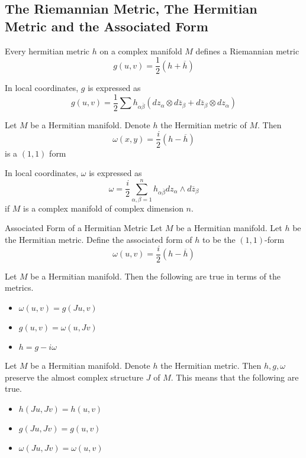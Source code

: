 \documentclass[a4paper]{article}
\begin{document}
\subsection{The Riemannian Metric, The Hermitian Metric and the Associated Form}
\begin{prp}{}{} Every hermitian metric $h$ on a complex manifold $M$ defines a Riemannian metric $$g(u,v)=\frac{1}{2}(h+\overline{h})$$
\end{prp}

In local coordinates, $g$ is expressed as $$g(u,v)=\frac{1}{2}\sum h_{\alpha\overline{\beta}}(dz_\alpha\otimes d\overline{z}_\beta+d\overline{z}_\beta\otimes dz_\alpha)$$

\begin{lmm}{}{} Let $M$ be a Hermitian manifold. Denote $h$ the Hermitian metric of $M$. Then $$\omega(x,y)=\frac{i}{2}(h-\overline{h})$$ is a $(1,1)$ form 
\end{lmm}

In local coordinates, $\omega$ is expressed as $$\omega=\frac{i}{2}\sum_{\alpha,\beta=1}^n h_{\alpha\overline{\beta}}dz_{\alpha}\wedge d\overline{z}_\beta$$ if $M$ is a complex manifold of complex dimension $n$. 

\begin{defn}{Associated Form of a Hermitian Metric}{} Let $M$ be a Hermitian manifold. Let $h$ be the Hermitian metric. Define the associated form of $h$ to be the $(1,1)$-form $$\omega(u,v)=\frac{i}{2}(h-\overline{h})$$
\end{defn}

\begin{prp}{}{} Let $M$ be a Hermitian manifold. Then the following are true in terms of the metrics. 
\begin{itemize}
\item $\omega(u,v)=g(Ju,v)$
\item $g(u,v)=\omega(u,Jv)$
\item $h=g-i\omega$
\end{itemize}
\end{prp}

\begin{thm}{}{} Let $M$ be a Hermitian manifold. Denote $h$ the Hermitian metric. Then $h,g,\omega$ preserve the almost complex structure $J$ of $M$. This means that the following are true. 
\begin{itemize}
\item $h(Ju,Jv)=h(u,v)$
\item $g(Ju,Jv)=g(u,v)$
\item $\omega(Ju,Jv)=\omega(u,v)$
\end{itemize}
\end{thm}
\end{document}
